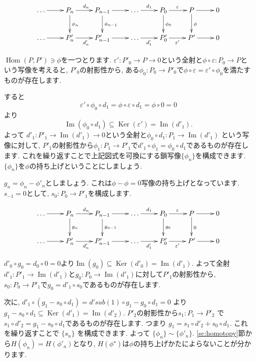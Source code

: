 \documentclass{jsarticle}
\newcommand{\makeop}[1]{\mathop{\mathrm{#1}}\nolimits}
\def\Im{\makeop{Im}}
\def\Ker{\makeop{Ker}}
\def\Hom{\makeop{Hom}}
\theoremstyle{definition}
\numberwithin{theorem}{section}
\begin{document}
\begin{equation*}
\xymatrix{
  \ldots \ar[r] & P_n \ar[r]^{d_n} \ar[d]^{\phi_n} & P_{n-1} \ar[r] \ar[d]^{\phi_{n-1}} & \ldots \ar[r]^{d_1} & P_0 \ar[r]^{\varepsilon} \ar[d]^{\phi_0} & P \ar[r] \ar[d]^{\phi} & 0 \\
  \ldots \ar[r] & P'_n \ar[r]_{d'_n} & P'_{n-1} \ar[r]& \ldots \ar[r]_{d'_1}& P'_0 \ar[r]_{\varepsilon'} & P' \ar[r]& 0
}
\end{equation*}

$\Hom(P, P') \ni \phi$を一つとります. $\varepsilon': P'_0 \rightarrow P \rightarrow 0$という全射と$\phi\circ\varepsilon: P_0 \rightarrow P$という写像を考えると, 
$P'_0$の射影性から, ある$\phi_0: P_0 \rightarrow P'_0$で$\phi\circ\varepsilon = \varepsilon'\circ\phi_0$を満たすものが存在します. 

すると
\[
\varepsilon'\circ\phi_0\circ d_1 = \phi\circ\varepsilon\circ d_1 = \phi\circ 0 = 0
\]
より
\[
\Im(\phi_0\circ d_1) \subseteq \Ker(\varepsilon') = \Im(d'_1).
\]
よって $d'_1 : P'_1 \rightarrow \Im(d'_1) \rightarrow 0$という全射と$\phi_0\circ d_1: P_1 \rightarrow \Im(d'_1)$
という写像に対して, $P'_1$の射影性から$\phi_1: P_1 \rightarrow P'_1$で$d'_1\circ \phi_1 = \phi_0\circ d_1$であるものが存在します.
これを繰り返すことで上記図式を可換にする鎖写像$\{\phi_n\}$を構成できます. $\{\phi_n\}$を$\phi$の持ち上げということにしましょう.

$g_n = \phi_n - \phi'_n$としましょう. これは$\phi-\phi = 0$写像の持ち上げとなっています. $s_{-1} = 0$として,
$s_0: P_0 \rightarrow P'_1$を構成します. 

\begin{equation*}
\xymatrix{
  \ldots \ar[r] & P_n \ar[r]^{d_n} \ar[d]^{g_n} & P_{n-1} \ar[r] \ar[d]^{g_{n-1}} & \ldots \ar[r]^{d_1} & P_0 \ar[r]^{\varepsilon} \ar[d]^{g_0} & P \ar[r] \ar[d]^{0} & 0 \\
  \ldots \ar[r] & P'_n \ar[r]_{d'_n} & P'_{n-1} \ar[r]& \ldots \ar[r]_{d'_1}& P'_0 \ar[r]_{\varepsilon'} & P' \ar[r]& 0
}
\end{equation*}

$d'_0\circ g_0 = d_0\circ 0 = 0$より$\Im(g_0) \subseteq \Ker(d'_0) = \Im(d'_1)$. よって全射
$d'_1: P'_1 \rightarrow \Im(d'_1)$と$g_0: P_0 \rightarrow \Im(d'_1)$に対して$P'_1$の射影性から, 
$s_0: P_0 \rightarrow P'_1$で$g_0 = d'_1 \circ s_0$であるものが存在します.

次に, $d'_1\circ(g_1 - s_0\circ d_1) = d'sub(1)\circ g_1 - g_0 \circ d_1 = 0$ より
$g_1 - s_0 \circ d_1 \subseteq \Ker(d'_1) = \Im(d'_2)$.
$P'_2$の射影性から$s_1: P_1 \rightarrow P'_2$ で $s_1\circ d'_2 = g_1 - s_0\circ d_1$であるものが存在します. つまり
$g_1 = s_1\circ d'_2 + s_0\circ d_1$. これを繰り返すことで $\{s_n\}$ を構成できます. よって $\{\phi_n\} \sim \{\phi'_n\}$.
\ref{sc:homotopy}節から$H(\phi_n) = H(\phi'_n)$となり, $H(\phi^\star)$は$\phi$の持ち上げかたによらないことが分かります.
\end{document}
